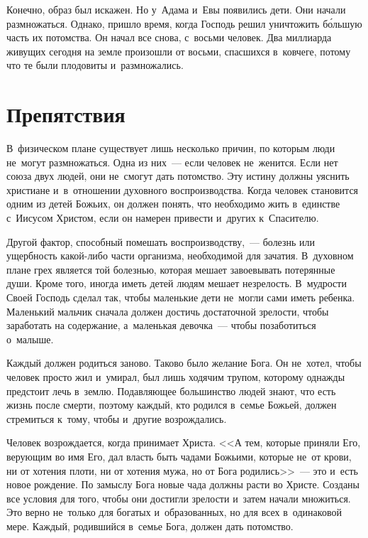 \documentclass[12pt,article,a4paper,fittopage]{ncc}
\begin{document}
\begin{multicols}{2}
Конечно, образ был искажен. Но у~Адама и~Евы появились дети. Они начали размножаться. Однако, пришло время, когда Господь решил уничтожить б\'{о}льшую часть их потомства. Он начал все снова, с~восьми человек. Два миллиарда живущих сегодня на земле произошли от восьми, спасшихся в~ковчеге, потому что те были плодовиты и~размножались.

\section*{Препятствия}

В~физическом плане существует лишь несколько причин, по которым люди не~могут размножаться. Одна из них~--- если человек не~женится. Если нет союза двух людей, они не~смогут дать потомство. Эту истину должны уяснить христиане и~в~отношении духовного воспроизводства. Когда человек становится одним из детей Божьих, он должен понять, что необходимо жить в~единстве с~Иисусом Христом, если он намерен привести и~других к~Спасителю.

Другой фактор, способный помешать воспроизводству,~--- болезнь или ущербность какой-либо части организма, необходимой для зачатия. В~духовном плане грех является той болезнью, которая мешает завоевывать потерянные души. Кроме того, иногда иметь детей людям мешает незрелость. В~мудрости Своей Господь сделал так, чтобы маленькие дети не~могли сами иметь ребенка. Маленький мальчик сначала должен достичь достаточной зрелости, чтобы заработать на содержание, а~маленькая девочка~--- чтобы позаботиться о~малыше.

\pagestyle{lheadings}

Каждый должен родиться заново. Таково было желание Бога. Он не~хотел, чтобы человек просто жил и~умирал, был лишь ходячим трупом, которому однажды предстоит лечь в~землю. Подавляющее большинство людей знают, что есть жизнь после смерти, поэтому каждый, кто родился в~семье Божьей, должен стремиться к~тому, чтобы и~другие возрождались.

Человек возрождается, когда принимает Христа. <<А тем, которые приняли Его, верующим во имя Его, дал власть быть чадами Божьими, которые не~от крови, ни от хотения плоти, ни от хотения мужа, но от Бога родились>>~--- это и~есть новое рождение. По замыслу Бога новые чада должны расти во Христе. Созданы все условия для того, чтобы они достигли зрелости и~затем начали множиться. Это верно не~только для богатых и~образованных, но для всех в~одинаковой мере. Каждый, родившийся в~семье Бога, должен дать потомство.


\end{multicols}
\end{document}
